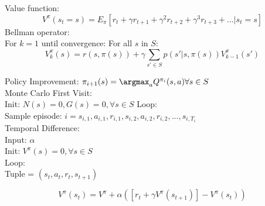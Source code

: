 Value function:
\[V^{\pi}(s_t = s) = E_{\pi}[r_t + \gamma r_{t+1} + \gamma^2r_{t+2}+ \gamma^3r_{t+3} + ... | s_t = s]\]
Bellman operator: \\
For $k=1$ until convergence:
For all $s$ in $S$:
\[V_{k}^{\pi }(s)= r(s, \pi(s)) + \gamma \sum_{{s}'\in S}{ p({s}'|s, \pi (s))V_{k-1}^{\pi }({s}')}\]

\noindent Policy Improvement: $\pi_{i+1 }(s)= \argmax_a Q^{\pi_{i}}(s,a) \forall s \in S$
\\
\noindent Monte Carlo First Visit: \\
Init: $ N(s) = 0, G(s) = 0, \forall s \in S $
Loop: \\
    Sample episode: $ i = s_{i,1}, a_{i,1}, r_{i,1}, s_{i,2}, a_{i,2}, r_{i,2}, ... , s_{i,T_i} $
\\
    Temporal Difference:\\
Input: $\alpha$ \\
Init: $ V^{\pi}(s)=0, \forall s \in S $ \\
Loop: \\
Tuple = $(s_{t},a_{t},r_{t},s_{t+1})$

\[V^\pi(s_{t}) = V^{\pi} + \alpha([r_{t}+\gamma V^{\pi}(s_{t+1})] - V^{\pi}(s_{t}))\]